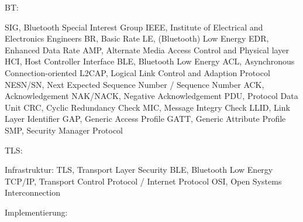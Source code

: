 BT:

SIG, Bluetooth Special Interest Group
IEEE, Institute of Electrical and Electronics Engineers
BR, Basic Rate
LE, (Bluetooth) Low Energy
EDR, Enhanced Data Rate
AMP, Alternate Media Access Control and Physical layer 
HCI, Host Controller Interface
BLE, Bluetooth Low Energy
ACL, Asynchronous Connection-oriented
L2CAP, Logical Link Control and Adaption Protocol
NESN/SN, Next Expected Sequence Number / Sequence Number
ACK, Acknowledgement
NAK/NACK, Negative Acknowledgement
PDU, Protocol Data Unit
CRC, Cyclic Redundancy Check
MIC, Message Integry Check
LLID, Link Layer Identifier
GAP, Generic Access Profile
GATT, Generic Attribute Profile
SMP, Security Manager Protocol

TLS:

Infrastruktur:
TLS, Transport Layer Security
BLE, Bluetooth Low Energy
TCP/IP, Transport Control Protocol / Internet Protocol
OSI, Open Systems Interconnection

Implementierung: